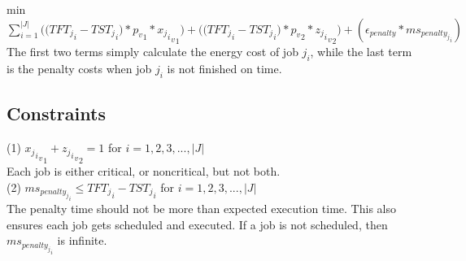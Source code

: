 \documentclass[conference]{IEEEtran}
\begin{document}
min $\displaystyle{\sum \limits_{i=1}^{|J|} { (({TFT_j}_i} - {TST_j}_i)*{p_v}_1*{{{{x_j}_i}_v}_1})
+ (({TFT_j}_i} - {TST_j}_i)*{p_v}_2*{{{{z_j}_i}_v}_2) + (\epsilon_{penalty} * ms_{{penalty_j}_i}) }$\\

The first two terms simply calculate the energy cost of job $j_i$, while the last term is the penalty costs when job $j_i$ is not finished on time.

\subsection{Constraints}
(1) ${{{{x_j}_i}_v}_1} +{{{{z_j}_i}_v}_2} = 1$ for $ i = 1, 2, 3, ..., |J|$\\
\newline\indent Each job is either critical, or noncritical, but not both.\\
\newline\indent(2) $  ms_{{penalty_j}_i} \leq {TFT_j}_i - {TST_j}_i$ for $ i = 1, 2, 3, ..., |J|$\\
\newline\indent The penalty time should not be more than expected execution time. This also ensures each job gets scheduled and executed. If a job is not scheduled, then $ms_{{penalty_j}_i}$ is infinite.\\


 





%
%
\end{document}
